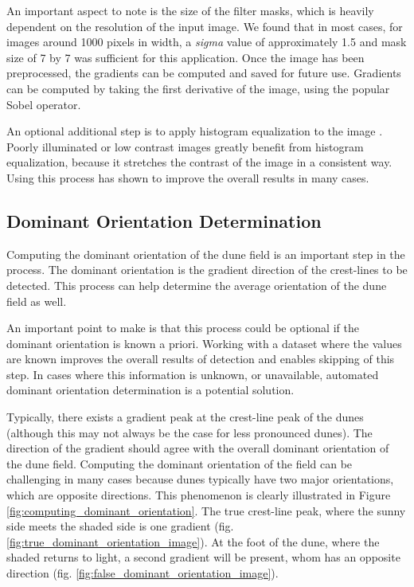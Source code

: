 \documentclass[review]{elsarticle}
\begin{document}
An important aspect to note is the size of the filter masks, which is heavily dependent on the resolution of the input image. We found that in most cases, for images around 1000 pixels in width, a \emph{sigma} value of approximately 1.5 and mask size of 7 by 7 was sufficient for this application. Once the image has been preprocessed, the gradients can be computed and saved for future use. Gradients can be computed by taking the first derivative of the image, using the popular Sobel operator.

An optional additional step is to apply histogram equalization to the image \cite{digital_image_processing_book}. Poorly illuminated or low contrast images greatly benefit from histogram equalization, because it stretches the contrast of the image in a consistent way. Using this process has shown to improve the overall results in many cases. 

\subsection{Dominant Orientation Determination}

Computing the dominant orientation of the dune field is an important step in the process. The dominant orientation is the gradient direction of the crest-lines to be detected. This process can help determine the average orientation of the dune field as well. 

An important point to make is that this process could be optional if the dominant orientation is known a priori. Working with a dataset where the values are known improves the overall results of detection and enables skipping of this step. In cases where this information is unknown, or unavailable, automated dominant orientation determination is a potential solution.

Typically, there exists a gradient peak at the crest-line peak of the dunes (although this may not always be the case for less pronounced dunes). The direction of the gradient should agree with the overall dominant orientation of the dune field. Computing the dominant orientation of the field can be challenging in many cases because dunes typically have two major orientations, which are opposite directions. This phenomenon is clearly illustrated in Figure \ref{fig:computing_dominant_orientation}. The true crest-line peak, where the sunny side meets the shaded side is one gradient (fig. \ref{fig:true_dominant_orientation_image}). At the foot of the dune, where the shaded returns to light, a second gradient will be present, whom has an opposite direction (fig. \ref{fig:false_dominant_orientation_image}).
\end{document}
